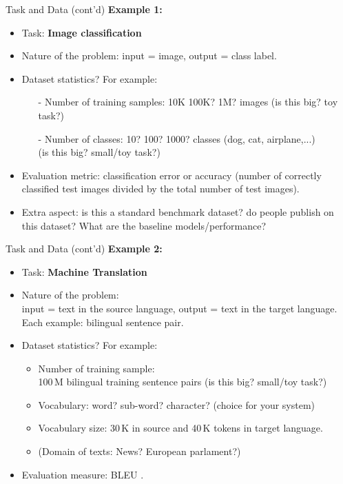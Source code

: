 \begin{frame}{Task and Data (cont'd)}
\textbf{Example 1:}
\vsp
\begin{itemize}
\item Task: \textbf{Image classification}
\pause
\item Nature of the problem: input = image, output = class label.
\pause
\item Dataset statistics? For example:
\begin{itemize}
\item[-] Number of training samples: 10K 100K? 1M? images (is this big? toy task?)
\item[-] Number of classes: 10? 100? 1000? classes (dog, cat, airplane,...)\\ (is this big? small/toy task?)\\
\end{itemize}
\pause
\item Evaluation metric: classification error or accuracy (number of correctly classified test images divided by the total number of test images).
\item Extra aspect: is this a standard benchmark dataset? do people publish on this dataset? What are the baseline models/performance? 
\end{itemize}
\end{frame}

\begin{frame}{Task and Data (cont'd)}
\textbf{Example 2:}
\vsp
\begin{itemize}
\item Task: \textbf{Machine Translation}
\pause
\item Nature of the problem:\\ input = text in the source language, output = text in the target language.\\
Each example: bilingual sentence pair.
\pause
\item Dataset statistics? For example: 
\begin{itemize}
\item Number of training sample:\\ 100\,M bilingual training sentence pairs (is this big? small/toy task?)
\item Vocabulary: word? sub-word? character? (choice for your system)
\item Vocabulary size: 30\,K in source and 40\,K tokens in target language.
\item (Domain of texts: News? European parlament?)
\end{itemize}
\item Evaluation measure: BLEU .
\end{itemize}
\end{frame}

